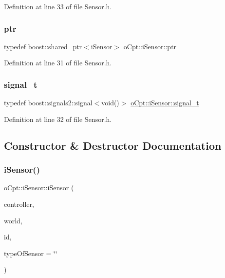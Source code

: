 Definition at line 33 of file Sensor.\+h.

\hypertarget{classo_cpt_1_1i_sensor_a03533d2c5dc66e332d70dbb3b5e3006a}{}\label{classo_cpt_1_1i_sensor_a03533d2c5dc66e332d70dbb3b5e3006a} 
\subsubsection{\texorpdfstring{ptr}{ptr}}
{\footnotesize\ttfamily typedef boost\+::shared\+\_\+ptr$<$\hyperlink{classo_cpt_1_1i_sensor}{i\+Sensor}$>$ \hyperlink{classo_cpt_1_1i_sensor_a03533d2c5dc66e332d70dbb3b5e3006a}{o\+Cpt\+::i\+Sensor\+::ptr}}



Definition at line 31 of file Sensor.\+h.

\hypertarget{classo_cpt_1_1i_sensor_a2e6d170acbc05f0b557bb68671813f6d}{}\label{classo_cpt_1_1i_sensor_a2e6d170acbc05f0b557bb68671813f6d} 
\subsubsection{\texorpdfstring{signal\+\_\+t}{signal\_t}}
{\footnotesize\ttfamily typedef boost\+::signals2\+::signal$<$void()$>$ \hyperlink{classo_cpt_1_1i_sensor_a2e6d170acbc05f0b557bb68671813f6d}{o\+Cpt\+::i\+Sensor\+::signal\+\_\+t}}



Definition at line 32 of file Sensor.\+h.



\subsection{Constructor \& Destructor Documentation}
\hypertarget{classo_cpt_1_1i_sensor_a548ca1dbeea64980181c434518659d3e}{}\label{classo_cpt_1_1i_sensor_a548ca1dbeea64980181c434518659d3e} 
\subsubsection{\texorpdfstring{i\+Sensor()}{iSensor()}}
{\footnotesize\ttfamily o\+Cpt\+::i\+Sensor\+::i\+Sensor (\begin{DoxyParamCaption}\item[{\hyperlink{classo_cpt_1_1i_controller_a6d89a95cd6ad68bb74adfaca2f36370f}{i\+Controller\+::ptr}}]{controller,  }\item[{\hyperlink{classo_cpt_1_1_world_aa6e591e3096d5de71e0cec9039663d67}{World\+::ptr}}]{world,  }\item[{std\+::string}]{id,  }\item[{std\+::string}]{type\+Of\+Sensor = {\ttfamily \char`\"{}\char`\"{}} }\end{DoxyParamCaption})}

